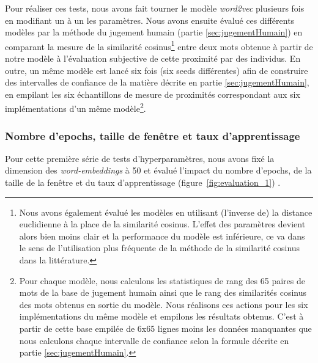 \documentclass[11pt,french,french]{article}
\let\rmarkdownfootnote\footnote%
\def\footnote{\protect\rmarkdownfootnote}
\begin{document}
Pour réaliser ces tests, nous avons fait tourner le modèle
\emph{word2vec} plusieurs fois en modifiant un à un les paramètres. Nous
avons ensuite évalué ces différents modèles par la méthode du
\og jugement humain \fg{} (partie \ref{sec:jugementHumain}) en comparant
la mesure de la similarité cosinus\footnote{Nous avons également évalué
  les modèles en utilisant (l'inverse de) la distance euclidienne à la
  place de la similarité cosinus. L'effet des paramètres devient alors
  bien moins clair et la performance du modèle est inférieure, ce va
  dans le sens de l'utilisation plus fréquente de la méthode de la
  similarité cosinus dans la littérature.} entre deux mots obtenue à
partir de notre modèle à l'évaluation subjective de cette proximité par
des individus. En outre, un même modèle est lancé six fois (six
\og seeds \fg{} différentes) afin de construire des intervalles de
confiance de la matière décrite en partie \ref{sec:jugementHumain}, en
empilant les six échantillons de mesure de proximités correspondant aux
six implémentations d'un même modèle\footnote{Pour chaque modèle, nous
  calculons les statistiques de rang des 65 paires de mots de la base de
  jugement humain ainsi que le rang des similarités cosinus des mots
  obtenus en sortie du modèle. Nous réalisons ces actions pour les six
  implémentations du même modèle et empilons les résultats obtenus.
  C'est à partir de cette base empilée de 6x65 lignes moins les données
  manquantes que nous calculons chaque intervalle de confiance selon la
  formule décrite en partie \ref{sec:jugementHumain}.}.

\subsubsection{Nombre d'epochs, taille de fenêtre et taux
d'apprentissage}\label{nombre-depochs-taille-de-fenuxeatre-et-taux-dapprentissage}

Pour cette première série de tests d'hyperparamètres, nous avons fixé la
dimension des \emph{word-embeddings} à 50 et évalué l'impact du nombre
d'epochs, de la taille de la fenêtre et du taux d'apprentissage
(figure~\ref{fig:evaluation_1}) .
\end{document}
